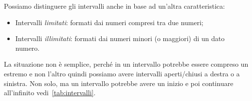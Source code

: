 Possiamo distinguere gli intervalli anche in base ad un'altra caratteristica:

\begin{itemize} [noitemsep]
 \item Intervalli \emph{limitati}: formati dai numeri compresi tra due numeri;
 \item Intervalli \emph{illimitati}: formati dai numeri minori (o maggiori) di
  un dato numero.
\end{itemize}

% 

La situazione non è semplice, perché in un intervallo potrebbe essere 
compreso un estremo e non l'altro quindi possiamo avere intervalli 
aperti/chiusi a destra o a sinistra. 
Non solo, ma un intervallo potrebbe avere un inizio e poi continuare 
all'infinito vedi~\ref{tab:intervalli}.

